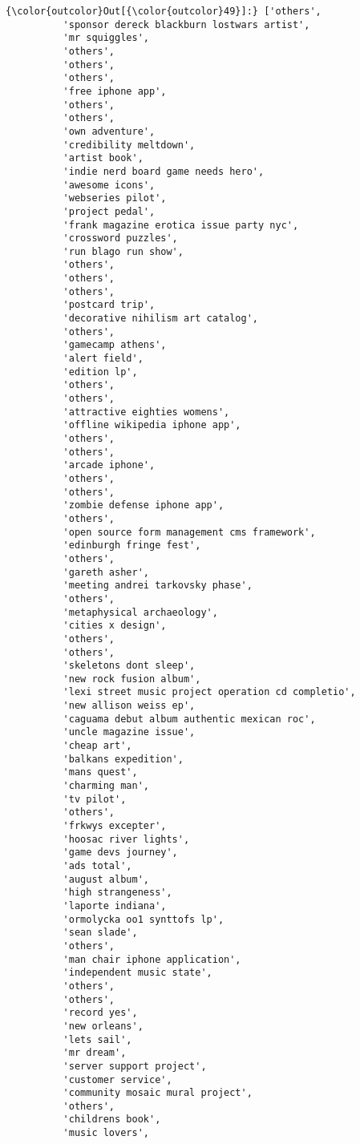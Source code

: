 \documentclass[11pt]{article}
\begin{document}
\begin{Verbatim}[commandchars=\\\{\}]
{\color{outcolor}Out[{\color{outcolor}49}]:} ['others',
          'sponsor dereck blackburn lostwars artist',
          'mr squiggles',
          'others',
          'others',
          'others',
          'free iphone app',
          'others',
          'others',
          'own adventure',
          'credibility meltdown',
          'artist book',
          'indie nerd board game needs hero',
          'awesome icons',
          'webseries pilot',
          'project pedal',
          'frank magazine erotica issue party nyc',
          'crossword puzzles',
          'run blago run show',
          'others',
          'others',
          'others',
          'postcard trip',
          'decorative nihilism art catalog',
          'others',
          'gamecamp athens',
          'alert field',
          'edition lp',
          'others',
          'others',
          'attractive eighties womens',
          'offline wikipedia iphone app',
          'others',
          'others',
          'arcade iphone',
          'others',
          'others',
          'zombie defense iphone app',
          'others',
          'open source form management cms framework',
          'edinburgh fringe fest',
          'others',
          'gareth asher',
          'meeting andrei tarkovsky phase',
          'others',
          'metaphysical archaeology',
          'cities x design',
          'others',
          'others',
          'skeletons dont sleep',
          'new rock fusion album',
          'lexi street music project operation cd completio',
          'new allison weiss ep',
          'caguama debut album authentic mexican roc',
          'uncle magazine issue',
          'cheap art',
          'balkans expedition',
          'mans quest',
          'charming man',
          'tv pilot',
          'others',
          'frkwys excepter',
          'hoosac river lights',
          'game devs journey',
          'ads total',
          'august album',
          'high strangeness',
          'laporte indiana',
          'ormolycka oo1 synttofs lp',
          'sean slade',
          'others',
          'man chair iphone application',
          'independent music state',
          'others',
          'others',
          'record yes',
          'new orleans',
          'lets sail',
          'mr dream',
          'server support project',
          'customer service',
          'community mosaic mural project',
          'others',
          'childrens book',
          'music lovers',

\end{Verbatim}
\end{document}
